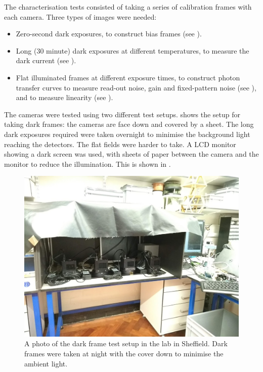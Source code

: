 \begin{colsection}
The characterisation tests consisted of taking a series of calibration frames with each camera. Three types of images were needed:

\begin{itemize}
    \item Zero-second dark exposures, to construct bias frames (see ).
    \item Long (30 minute) dark exposures at different temperatures, to measure the dark current (see ).
    \item Flat illuminated frames at different exposure times, to construct photon transfer curves to measure read-out noise, gain and fixed-pattern noise (see ), and to measure linearity (see ).
\end{itemize}

The cameras were tested using two different test setups.  shows the setup for taking dark frames: the cameras are face down and covered by a sheet. The long dark exposures required were taken overnight to minimise the background light reaching the detectors. The flat fields were harder to take. A LCD monitor showing a dark screen was used, with sheets of paper between the camera and the monitor to reduce the illumination. This is shown in .

\begin{figure}[p]
    \begin{center}
        \includegraphics[width=0.75\linewidth]{images/dark_photo.jpg}
    \end{center}
    \caption[The dark frame test setup]{
        A photo of the dark frame test setup in the lab in Sheffield. Dark frames were taken at night with the cover down to minimise the ambient light.
    }\label{fig:dark_photo}
\end{figure}


\end{colsection}
